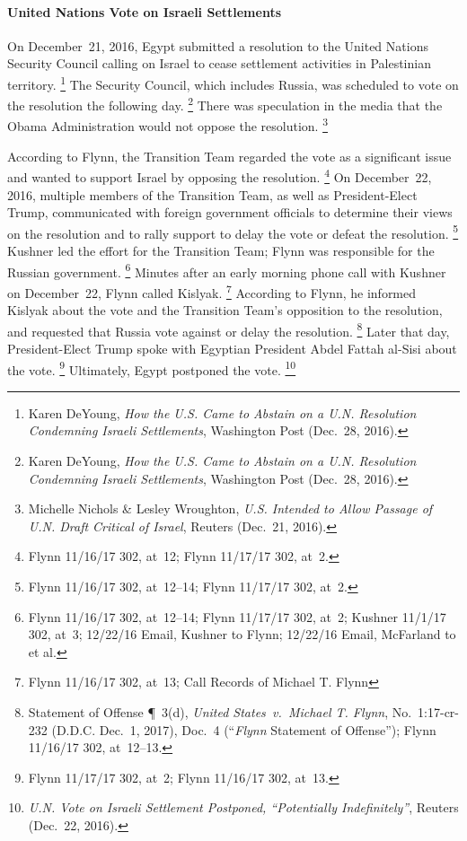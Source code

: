 \paragraph{United Nations Vote on Israeli Settlements}

On December~21, 2016, Egypt submitted a resolution to the United Nations Security Council calling on Israel to cease settlement activities in Palestinian territory.%
\footnote{Karen DeYoung, \textit{How the U.S. Came to Abstain on a U.N. Resolution Condemning Israeli Settlements}, Washington Post (Dec.~28, 2016).}
The Security Council, which includes Russia, was scheduled to vote on the resolution the following day.%
\footnote{Karen DeYoung, \textit{How the U.S. Came to Abstain on a U.N. Resolution Condemning Israeli Settlements}, Washington Post (Dec.~28, 2016).}
There was speculation in the media that the Obama Administration would not oppose the resolution.%
\footnote{Michelle Nichols \& Lesley Wroughton, \textit{U.S. Intended to Allow Passage of U.N. Draft Critical of Israel}, Reuters (Dec.~21, 2016).}

According to Flynn, the Transition Team regarded the vote as a significant issue and wanted to support Israel by opposing the resolution.%
\footnote{Flynn 11/16/17 302, at~12;
Flynn 11/17/17 302, at~2.}
On December~22, 2016, multiple members of the Transition Team, as well as President-Elect Trump, communicated with foreign government officials to determine their views on the resolution and to rally support to delay the vote or defeat the resolution.%
\footnote{Flynn 11/16/17 302, at~12--14;
Flynn 11/17/17 302, at~2.}
Kushner led the effort for the Transition Team; Flynn was responsible for the Russian government.%
\footnote{Flynn 11/16/17 302, at~12--14;
Flynn 11/17/17 302, at~2;
Kushner 11/1/17 302, at~3;
12/22/16 Email, Kushner to Flynn;
12/22/16 Email, McFarland to  et al.}
Minutes after an early morning phone call with Kushner on December~22, Flynn called Kislyak.%
\footnote{Flynn 11/16/17 302, at~13;
Call Records of Michael T. Flynn }
According to Flynn, he informed Kislyak about the vote and the Transition Team's opposition to the resolution, and requested that Russia vote against or delay the resolution.%
\footnote{Statement of Offense \P~3(d), \textit{United States~v.\ Michael T. Flynn}, No.~1:17-cr-232 (D.D.C. Dec.~1, 2017), Doc.~4 (``\textit{Flynn} Statement of Offense'');
Flynn 11/16/17 302, at~12--13.}
Later that day, President-Elect Trump spoke with Egyptian President Abdel Fattah al-Sisi about the vote.%
\footnote{Flynn 11/17/17 302, at~2;
Flynn 11/16/17 302, at~13.}
Ultimately, Egypt postponed the vote.%
\footnote{\textit{U.N. Vote on Israeli Settlement Postponed, ``Potentially Indefinitely''}, Reuters (Dec.~22, 2016).}

